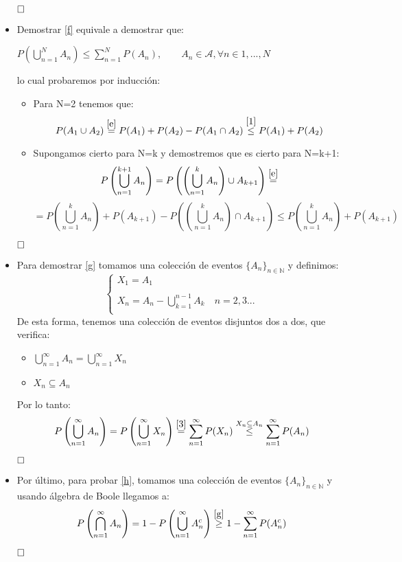 \documentclass[a4paper, 12pt]{article}
\theoremstyle{plain}
\theoremstyle{definition}
\theoremstyle{remark}
\begin{document}
\begin{itemize}
		$\hfill\square$
		\item Demostrar \ref{f} equivale a demostrar que: 
		
		$P(\bigcup_{n=1}^N A_n)\leq \sum_{n=1}^{N}P(A_n), \qquad A_n\in\mathcal{A},\forall n\in {1,...,N}$
		
		lo cual probaremos por inducción:
		\begin{itemize}
			\item Para N=2 tenemos que:
			\[P(A_1\cup A_2)\overset{\ref{e}}{=}P(A_1)+P(A_2)-P(A_1\cap A_2)\overset{\ref{1}}{\leq} P(A_1)+P(A_2)\]
			\item Supongamos cierto para N=k y demostremos que es cierto para N=k+1:
			\[P\left(\bigcup_{n=1}^{k+1}A_n\right)=P\left(\left(\bigcup_{n=1}^{k}A_n\right)\cup A_{k+1}\right)\overset{\ref{e}}{=}\]
			\[=P\left(\bigcup_{n=1}^{k}A_n\right)+P(A_{k+1})-P\left(\left(\bigcup_{n=1}^{k}A_n\right)\cap A_{k+1}\right)\leq P\left(\bigcup_{n=1}^{k}A_n\right)+P(A_{k+1})
			\]
		\end{itemize}
	
		$\hfill\square$
		\item Para demostrar \ref{g} tomamos una colección de eventos $\{A_n\}_{n\in\mathbb{N}}$ y definimos:
		\[
		\left\{ \begin{array}{lcc}
		X_1=A_1 \\
		\\ X_n=A_n-\bigcup_{k=1}^{n-1}A_k \quad n=2,3...  \\
		\end{array}\]
		De esta forma, tenemos una colección de eventos disjuntos dos a dos, que verifica:
			\begin{itemize}
				\item $\bigcup_{n=1}^{\infty}A_n=\bigcup_{n=1}^{\infty}X_n$
				\item $X_n\subseteq A_n$
			\end{itemize}
		Por lo tanto:
		\[
		P\left(\bigcup_{n=1}^\infty A_n\right)=P\left(\bigcup_{n=1}^\infty X_n\right)\overset{\ref{3}}{=}\sum_{n=1}^{\infty}P(X_n)\overset{X_n\subseteq A_n}{\leq}\sum_{n=1}^{\infty}P(A_n)
		\]
		
		$\hfill\square$
		\item Por último, para probar \ref{h}, tomamos una colección de eventos $\{A_n\}_{n\in\mathbb{N}}$ y usando álgebra de Boole llegamos a:
		\[
		P\left(\bigcap_{n=1}^{\infty}A_n\right)=1-P\left(\bigcup_{n=1}^\infty A_n^c\right)\overset{\ref{g}}{\geq}1-\sum_{n=1}^\infty P(A_n^c)
		\]
		
		$\hfill\square$
	\end{itemize}
\end{document}
